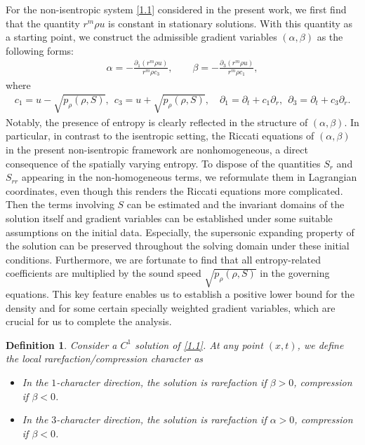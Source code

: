 \documentclass[11pt,reqno]{article}
\newtheorem{defn}{Definition}[section]
\numberwithin{equation}{section}
\begin{document}
For the non-isentropic system \eqref{1.1} considered in the present work, we first find that the quantity $r^m \rho u$ is constant in stationary solutions. With this quantity as a starting point,
we construct the admissible gradient variables $(\alpha,\beta)$ as the following forms:
\begin{align}\label{1.4}
\alpha=-\frac{\partial_1(r^m \rho u)}{r^m \rho c_3}, \qquad \beta=-\frac{\partial_3(r^m \rho u)}{r^m \rho c_1},
\end{align}
where
\begin{align}\label{1.5}
c_1 =u-\sqrt{p_\rho(\rho, S)},\ \ c_3 =u+\sqrt{p_\rho(\rho, S)},\quad \partial_1=\partial_t+c_1 \partial_r, \ \ \partial_3=\partial_t+c_3 \partial_r.
\end{align}
Notably, the presence of entropy is clearly reflected in the structure of $(\alpha,\beta)$.
In particular, in contrast to the isentropic setting, the Riccati equations of $(\alpha,\beta)$ in the present non-isentropic framework are nonhomogeneous, a direct consequence of the spatially varying entropy. To dispose of the quantities $S_r$ and $S_{rr}$ appearing in the non-homogeneous terms, we reformulate them in Lagrangian coordinates, even though this renders the Riccati equations more complicated. Then the terms involving $S$ can be estimated and the invariant domains of the solution itself and gradient variables can be established under some suitable assumptions on the initial data. Especially, the supersonic expanding property of the solution can be preserved throughout the  solving domain under these initial conditions.
Furthermore, we are fortunate to find that all entropy-related coefficients are multiplied by the sound speed $\sqrt{p_\rho(\rho, S)}$ in the governing equations. This key feature enables us to establish a positive lower bound for the density and for some certain specially weighted gradient variables, which are crucial for us to complete the analysis.

\begin{defn}\label{def1}
Consider a $C^1$ solution of \eqref{1.1}. At any point $(x,t)$, we define the local rarefaction/compression character as
\begin{itemize}
\item In the $1$-character direction, the solution is rarefaction if $\beta>0$, compression if $\beta<0$.
\item  In the $3$-character direction, the solution is rarefaction if $\alpha>0$, compression if $\beta<0$.
\end{itemize}
\end{defn}
\end{document}
